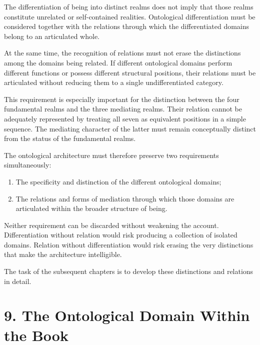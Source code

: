 The differentiation of being into distinct realms
does not imply that those realms constitute unrelated
or self-contained realities. Ontological differentiation
must be considered together with the relations through
which the differentiated domains belong to an
articulated whole.

At the same time, the recognition of relations must
not erase the distinctions among the domains being
related. If different ontological domains perform
different functions or possess different structural
positions, their relations must be articulated without
reducing them to a single undifferentiated category.

This requirement is especially important for the
distinction between the four fundamental realms and
the three mediating realms. Their relation cannot
be adequately represented by treating all seven
as equivalent positions in a simple sequence.
The mediating character of the latter must remain
conceptually distinct from the status of the
fundamental realms.

The ontological architecture must therefore preserve
two requirements simultaneously:

\begin{enumerate}
    \item The specificity and distinction of the
    different ontological domains;

    \item The relations and forms of mediation
    through which those domains are articulated
    within the broader structure of being.
\end{enumerate}

Neither requirement can be discarded without
weakening the account. Differentiation without
relation would risk producing a collection of
isolated domains. Relation without differentiation
would risk erasing the very distinctions that
make the architecture intelligible.

The task of the subsequent chapters is to develop
these distinctions and relations in detail.


\section*{9. The Ontological Domain Within the Book}

